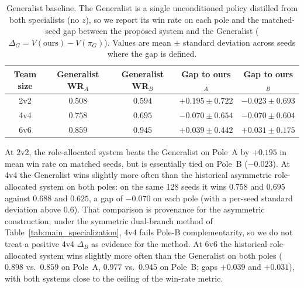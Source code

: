 \begin{table}[t]
\centering
\caption{Generalist baseline. The Generalist is a single unconditioned policy
distilled from both specialists (no $z$), so we report its win rate on each
pole and the matched-seed gap between the proposed system and the Generalist
($\Delta_G = V(\mathrm{ours}) - V(\pi_G)$). Values are mean $\pm$ standard
deviation across seeds where the gap is defined.}
\label{tab:generalist_baseline}
\begin{tabular}{c|cccc}
\hline
Team size
& Generalist WR$_A$
& Generalist WR$_B$
& Gap to ours$_A$
& Gap to ours$_B$ \\
\hline
2v2
& $0.508$
& $0.594$
& $+0.195 \pm 0.722$
& $-0.023 \pm 0.693$ \\ %
4v4
& $0.758$
& $0.695$
& $-0.070 \pm 0.654$
& $-0.070 \pm 0.604$ \\ %
6v6
& $0.859$
& $0.945$
& $+0.039 \pm 0.442$
& $+0.031 \pm 0.175$ \\ %
\hline
\end{tabular}
\end{table}

At 2v2, the role-allocated system beats the Generalist on Pole~A by
$+0.195$ in mean win rate on matched seeds, but is essentially tied on Pole~B
($-0.023$). At 4v4 the Generalist wins slightly more often than the
historical asymmetric role-allocated system on both poles: on the same 128
seeds it wins $0.758$ and $0.695$ against $0.688$ and $0.625$, a gap of
$-0.070$ on each pole (with a per-seed standard deviation above $0.6$). That
comparison is provenance for the asymmetric construction; under the
symmetric dual-branch method of Table~\ref{tab:main_specialization}, 4v4
fails Pole-B complementarity, so we do not treat a positive 4v4
$\Delta_B$ as evidence for the method. At 6v6 the historical role-allocated
system wins slightly more often
than the Generalist on both poles ($0.898$ vs.\ $0.859$ on Pole~A, $0.977$
vs.\ $0.945$ on Pole~B; gaps $+0.039$ and $+0.031$), with both systems close
to the ceiling of the win-rate metric.


